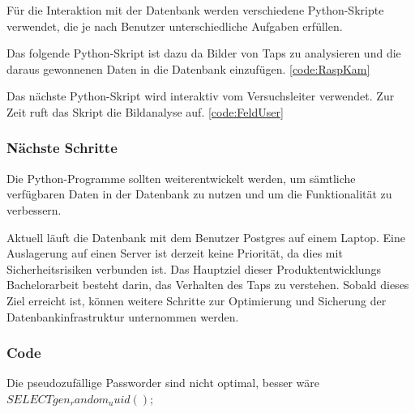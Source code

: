Für die Interaktion mit der Datenbank werden verschiedene Python-Skripte verwendet, die je nach Benutzer unterschiedliche Aufgaben erfüllen.

Das folgende Python-Skript ist dazu da Bilder von Taps zu analysieren und die daraus gewonnenen Daten in die Datenbank einzufügen. \ref{code:RaspKam}

Das nächste Python-Skript wird interaktiv vom Versuchsleiter verwendet. Zur Zeit ruft das Skript die Bildanalyse auf. \ref{code:FeldUser}


\subsubsection{Nächste Schritte}

Die Python-Programme sollten weiterentwickelt werden, um sämtliche verfügbaren Daten in der Datenbank zu nutzen und um die Funktionalität zu verbessern.

Aktuell läuft die Datenbank mit dem Benutzer Postgres auf einem Laptop. Eine Auslagerung auf einen Server ist derzeit keine Priorität, da dies mit Sicherheitsrisiken verbunden ist. Das Hauptziel dieser Produktentwicklungs Bachelorarbeit besteht darin, das Verhalten des Taps zu verstehen. Sobald dieses Ziel erreicht ist, können weitere Schritte zur Optimierung und Sicherung der Datenbankinfrastruktur unternommen werden.

\subsubsection{Code}
\label{sect:code}



Die pseudozufällige Passworder sind nicht optimal, besser wäre $SELECT gen_random_uuid();$











